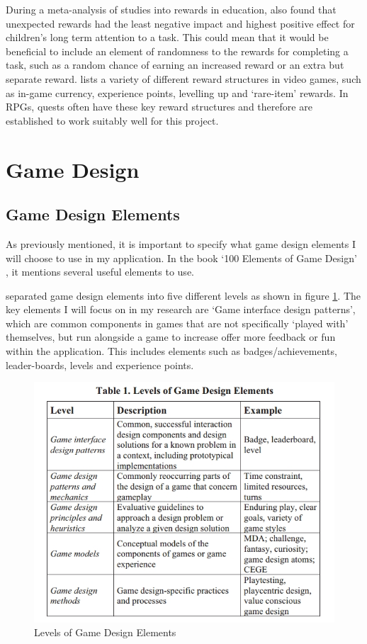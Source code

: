 During a meta-analysis of studies into rewards in education, \cite{deci2001extrinsic} also found that unexpected rewards had the least negative impact and highest positive effect for children's long term attention to a task. 
This could mean that it would be beneficial to include an element of randomness to the rewards for completing a task, such as a random chance of earning an increased reward or an extra but separate reward.
\cite{king2010video} lists a variety of different reward structures in video games, such as in-game currency, experience points, levelling up and `rare-item' rewards. 
In RPGs, quests often have these key reward structures and therefore are established to work suitably well for this project.

\section{Game Design}
\subsection{Game Design Elements}
As previously mentioned, it is important to specify what game design elements I will choose to use in my application.
In the book `100 Elements of Game Design' \citep{despain2012100}, it mentions several useful elements to use.

\cite{Deterding:2011:GDE:2181037.2181040} separated game design elements into five different levels as shown in figure \ref{fig:GameDesignElements}. 
The key elements I will focus on in my research are `Game interface design patterns', which are common components in games that are not specifically `played with' themselves, but run alongside a game to increase offer more feedback or fun within the application.
This includes elements such as badges/achievements, leader-boards, levels and experience points. 

\begin{figure}[ht]
	\centering
	\includegraphics[scale=0.45]{images/DeterdingsLevelsOfGameDesignElements.jpg}
	\caption{Levels of Game Design Elements}
	\label{fig:GameDesignElements}
\end{figure}


